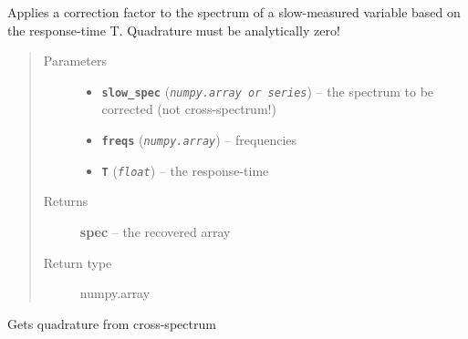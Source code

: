 \documentclass[a4paper,10pt,oneside]{sphinxmanual}
\begin{document}
\begin{fulllineitems}
\label{pymicra.micro:pymicra.micro.spectral.hfc_zeroQuad}
Applies a correction factor to the spectrum of a slow-measured variable
based on the response-time T. Quadrature must be analytically zero!
\begin{quote}\begin{description}
\item[{Parameters}] \leavevmode\begin{itemize}
\item {} 
\textbf{\texttt{slow\_spec}} (\emph{\texttt{numpy.array or series}}) -- the spectrum to be corrected (not cross-spectrum!)

\item {} 
\textbf{\texttt{freqs}} (\emph{\texttt{numpy.array}}) -- frequencies

\item {} 
\textbf{\texttt{T}} (\emph{\texttt{float}}) -- the response-time

\end{itemize}

\item[{Returns}] \leavevmode
\textbf{spec} -- the recovered array

\item[{Return type}] \leavevmode
numpy.array

\end{description}\end{quote}

\end{fulllineitems}


\begin{fulllineitems}
\label{pymicra.micro:pymicra.micro.spectral.phaseCorrection}
\end{fulllineitems}


\begin{fulllineitems}
\label{pymicra.micro:pymicra.micro.spectral.quadrature}
Gets quadrature from cross-spectrum

\end{fulllineitems}
\end{document}
